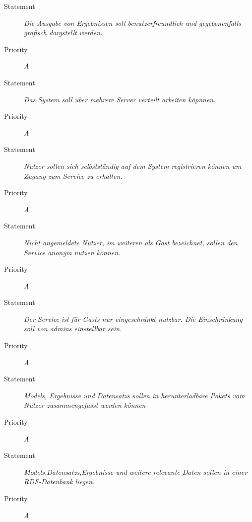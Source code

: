 \UR
\begin{description}
\item[Statement] \textit{Die Ausgabe von Ergebnissen soll benutzerfreundlich und gegebenenfalls grafisch dargstellt werden.}
\item[Priority] \textit{A}
\end{description}

\UR
\begin{description}
\item[Statement] \textit{Das System soll über mehrere Server verteilt arbeiten köpnnen.}
\item[Priority] \textit{A}
\end{description}


\UR
\begin{description}
\item[Statement] \textit{Nutzer sollen sich selbstständig auf dem System registrieren können um Zugang zum Service zu erhalten.}
\item[Priority] \textit{A}
\end{description}

\UR
\begin{description}
\item[Statement] \textit{Nicht angemeldete Nutzer, im weiteren als \gls{Gast} bezeichnet, sollen den Service anonym nutzen können.}
\item[Priority] \textit{A}
\end{description}

\UR
\begin{description}
\item[Statement] \textit{Der Service ist für \glspl{Gast} nur eingeschränkt nutzbar. Die Einschränkung soll von \glspl{admin} einstellbar sein.}
\item[Priority] \textit{A}
\end{description}

\UR
\begin{description}
\item[Statement] \textit{\glspl{Model}, Ergebnisse und \glspl{Datensatz} sollen in  herunterladbare \glspl{Paket} vom Nutzer zusammengefasst werden können}%
\item[Priority] \textit{A}
\end{description}

\UR
\begin{description}
\item[Statement] \textit{\glspl{Model},\glspl{Datensatz},Ergebnisse und weitere relevante Daten sollen in einer \gls{RDF}-Datenbank liegen.}%
\item[Priority] \textit{A}
\end{description}

